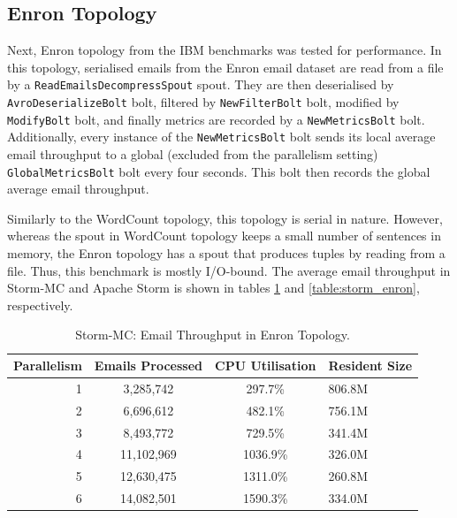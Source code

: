\documentclass[bsc,logo,frontabs,twoside,singlespacing,normalheadings,parskip]{infthesis}\usepackage[]{graphicx}\usepackage[]{color}
\begin{document}
\subsection{Enron Topology}

Next, Enron topology from the IBM benchmarks was tested for performance. In this topology, serialised emails from the Enron email dataset are read from a file by a \texttt{ReadEmailsDecompressSpout} spout. They are then deserialised by \texttt{AvroDeserializeBolt} bolt, filtered by \texttt{NewFilterBolt} bolt, modified by \texttt{ModifyBolt} bolt, and finally metrics are recorded by a \texttt{NewMetricsBolt} bolt. Additionally, every instance of the \texttt{NewMetricsBolt} bolt sends its local average email throughput to a global (excluded from the parallelism setting) \texttt{GlobalMetricsBolt} bolt every four seconds. This bolt then records the global average email throughput.

Similarly to the WordCount topology, this topology is serial in nature. However, whereas the spout in  WordCount topology keeps a small number of sentences in memory, the Enron topology has a spout that produces tuples by reading from a file. Thus, this benchmark is mostly I/O-bound. The average email throughput in Storm-MC and Apache Storm is shown in tables \ref{table:storm_mc_enron} and \ref{table:storm_enron}, respectively. 

\begin{table}[!htb]
\begin{adjustwidth}{-0.5in}{-0.5in}
\centering
\small
\begin{tabular}{@{}rccl@{}}
    \textbf{Parallelism} & \textbf{Emails Processed} & \textbf{CPU Utilisation} & \textbf{Resident Size} \\ \toprule
    1 & {3,285,742} & {297.7\%} & {806.8M} \\
    2 & {6,696,612} & {482.1\%} & {756.1M} \\
    3 & {8,493,772} & {729.5\%} & {341.4M} \\
    4 & {11,102,969} & {1036.9\%} & {326.0M} \\
    5 & {12,630,475} & {1311.0\%} & {260.8M} \\
    6 & {14,082,501} & {1590.3\%} & {334.0M} \\
\end{tabular}
\caption{Storm-MC: Email Throughput in Enron Topology.}
\label{table:storm_mc_enron}
\end{adjustwidth}
\end{table}
\end{document}

